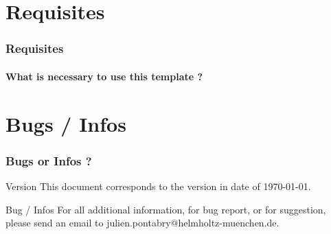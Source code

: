 \documentclass[xcolor=dvipsnames]{beamer}
\begin{document}
	\section{Requisites}
		\begin{frame}
			\frametitle{Requisites}
			\framesubtitle{What is necessary to use this template ?}
			
		\end{frame}
		
	\section{Bugs / Infos}
		\begin{frame}
			\frametitle{Bugs or Infos ?}
			\begin{exampleblock}{Version}
				This document corresponds to the version in date of \today.
			\end{exampleblock}
			\begin{alertblock}{Bug / Infos}
				For all additional information, for bug report, or for suggestion, please send an email to julien.pontabry@helmholtz-muenchen.de.
			\end{alertblock}
		\end{frame}
\end{document}
